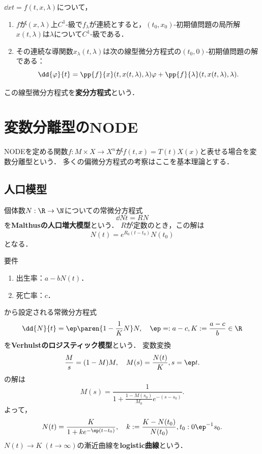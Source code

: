 \documentclass[uplatex,dvipdfmx]{jsreport}
\begin{document}
\begin{theorem}
    $\dd{x}{t}=f(t,x,\lambda)$について，
    \begin{enumerate}
        \item $f$が$(x,\lambda)$上$C^1$-級で$f_\lambda$が連続とすると，$(t_0,x_0)$-初期値問題の局所解$x(t,\lambda)$は$\lambda$について$C^1$-級である．
        \item その連続な導関数$x_\lambda(t,\lambda)$は次の線型微分方程式の$(t_0,0)$-初期値問題の解である：
        \[\dd{\varphi}{t}=\pp{f}{x}(t,x(t,\lambda),\lambda)\varphi+\pp{f}{\lambda}(t,x(t,\lambda),\lambda).\]
    \end{enumerate}
    この線型微分方程式を\textbf{変分方程式}という．
\end{theorem}

\section{変数分離型のNODE}

\begin{tcolorbox}[colframe=ForestGreen, colback=ForestGreen!10!white,breakable,colbacktitle=ForestGreen!40!white,coltitle=black,fonttitle=\bfseries\sffamily,
title=]
    NODEを定める関数$f:M\times X\to X^n$が$f(t,x)=T(t)X(x)$と表せる場合を変数分離型という．
    多くの偏微分方程式の考察はここを基本理論とする．
\end{tcolorbox}

\subsection{人口模型}

\begin{model}[Malthus]
    個体数$N:\R\to\N$についての常微分方程式
    \[\dd{N}{t}=RN\]
    を\textbf{Malthusの人口増大模型}という．
    $R$が定数のとき，この解は
    \[N(t)=e^{R_0(t-t_0)}N(t_0)\]
    となる．
\end{model}

\begin{model}[Verhulst]
    要件
    \begin{enumerate}
        \item 出生率：$a-bN(t)$．
        \item 死亡率：$c$．
    \end{enumerate}
    から設定される常微分方程式
    \[\dd{N}{t}=\ep\paren{1-\frac{1}{K}N}N,\quad\ep=:a-c,K:=\frac{a-c}{b}\in\R\]
    を\textbf{Verhulstのロジスティック模型}という．
    変数変換
    \[\frac{M}{s}=(1-M)M,\quad M(s)=\frac{N(t)}{K},s=\ep t.\]
    の解は
    \[M(s)=\frac{1}{1+\frac{1-M(s_0)}{M_0}e^{-(s-s_0)}}.\]
    よって，
    \[N(t)=\frac{K}{1+ke^{-\ep(t-t_0)}},\quad k:=\frac{K-N(t_0)}{N(t_0)},t_0:0\ep^{-1}s_0.\]
    $N(t)\to K\;(t\to\infty)$の漸近曲線を\textbf{logistic曲線}という．
\end{model}
\end{document}
